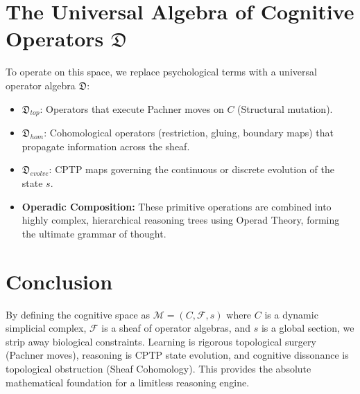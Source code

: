 \documentclass[12pt]{article}
\begin{document}
\section{The Universal Algebra of Cognitive Operators $\mathfrak{D}$}
To operate on this space, we replace psychological terms with a universal operator algebra $\mathfrak{D}$:
\begin{itemize}
    \item $\mathfrak{D}_{top}$: Operators that execute Pachner moves on $C$ (Structural mutation).
    \item $\mathfrak{D}_{hom}$: Cohomological operators (restriction, gluing, boundary maps) that propagate information across the sheaf.
    \item $\mathfrak{D}_{evolve}$: CPTP maps governing the continuous or discrete evolution of the state $s$.
    \item \textbf{Operadic Composition:} These primitive operations are combined into highly complex, hierarchical reasoning trees using Operad Theory, forming the ultimate grammar of thought.
\end{itemize}

\section{Conclusion}
By defining the cognitive space as $\mathcal{M} = (C, \mathcal{F}, s)$ where $C$ is a dynamic simplicial complex, $\mathcal{F}$ is a sheaf of operator algebras, and $s$ is a global section, we strip away biological constraints. Learning is rigorous topological surgery (Pachner moves), reasoning is CPTP state evolution, and cognitive dissonance is topological obstruction (Sheaf Cohomology). This provides the absolute mathematical foundation for a limitless reasoning engine.
\end{document}
